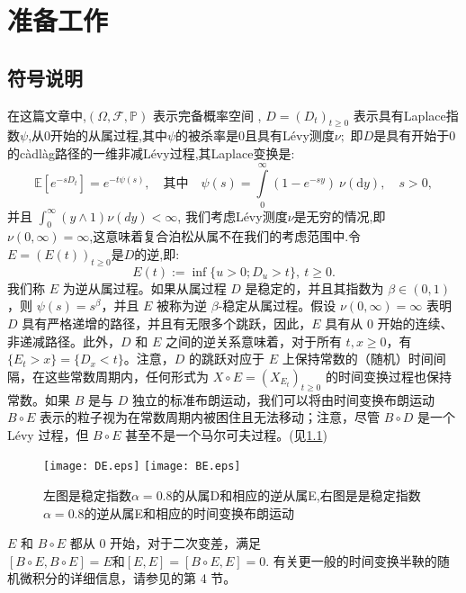 

\chapter{准备工作}\label{chap:LaTeXEnv}

\section{符号说明}
在这篇文章中,$(\Omega,\mathcal{F},\mathbb{P})$ 表示完备概率空间 , $D=(D_t)_{t\geq0}$ 表示具有Laplace指数$\psi$,从0开始的从属过程,其中$\psi$的被杀率是0且具有Lévy测度$\nu;$ 即$D$是具有开始于0的càdlàg路径的一维非减Lévy过程,其Laplace变换是:
$$\mathbb{E}[e^{-sD_t}]=e^{-t\psi(s)},\quad\text{其中}\quad\psi(s)=\int\limits_0^\infty(1-e^{-sy})\:\nu(\text{d}y),\quad s>0,$$
并且 $\int_0^\infty(y\wedge1)\nu(dy) < \infty$,
我们考虑Lévy测度$\nu$是无穷的情况,即$\nu ( 0, \infty ) = \infty$,这意味着复合泊松从属不在我们的考虑范围中.令 $E=(E(t))_{t\geq0}$是$D$的逆,即:
$$E(t):=\inf\{u>0;D_u>t\},\:t\geq0.$$
我们称 \( E \) 为逆从属过程。如果从属过程 \( D \) 是稳定的，并且其指数为 \( \beta \in (0,1) \)，则 \( \psi(s) = s^{\beta} \)，并且 \( E \) 被称为逆 \( \beta \)-稳定从属过程。假设 \( \nu(0,\infty) = \infty \) 表明 \( D \) 具有严格递增的路径，并且有无限多个跳跃，因此，\( E \) 具有从 0 开始的连续、非递减路径。此外，\( D \) 和 \( E \) 之间的逆关系意味着，对于所有 \( t, x \geq 0 \)，有$\{E_t > x\} = \{D_x < t\}$。注意，\( D \) 的跳跃对应于 \( E \) 上保持常数的（随机）时间间隔，在这些常数周期内，任何形式为 \( X \circ E = (X_{E_t})_{t \geq 0} \) 的时间变换过程也保持常数。如果 \( B \) 是与 \( D \) 独立的标准布朗运动，我们可以将由时间变换布朗运动 \( B \circ E \) 表示的粒子视为在常数周期内被困住且无法移动；注意，尽管 \( B \circ D \) 是一个 Lévy 过程，但 \( B \circ E \) 甚至不是一个马尔可夫过程。(见\cref{fig:image1})

\begin{figure}[htp!]
	\centering
	\texttt{[image: DE.eps]}
	\hfill
	\texttt{[image: BE.eps]}
	\caption{左图是稳定指数$\alpha=0.8$的从属D和相应的逆从属E,右图是是稳定指数$\alpha=0.8$的逆从属E和相应的时间变换布朗运动}
	\label{fig:image1}
	\vspace{-2ex}
\end{figure}

\( E \) 和 \( B \circ E \) 都从 0 开始，对于二次变差，满足$
[B \circ E, B \circ E] = E  \text{和} [E, E] = [B \circ E, E] = 0.$
有关更一般的时间变换半鞅的随机微积分的详细信息，请参见\cite{kobayashi2011stochastic}的第 4 节。

